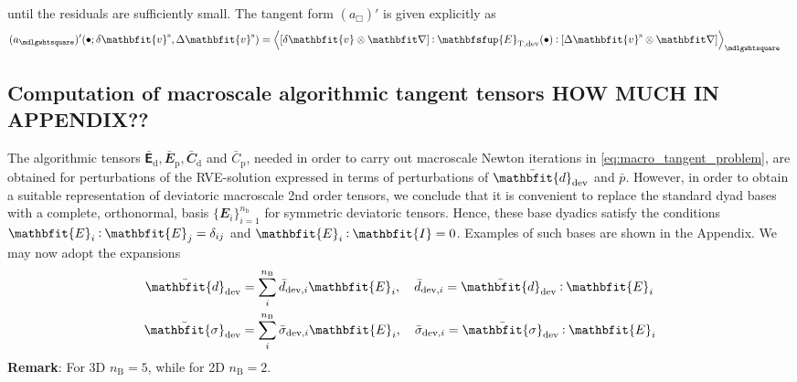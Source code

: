 \documentclass[12pt,a4paper,fleqn]{article}
\renewcommand{\ta}[1]{\mathbfit{#1}}
\renewcommand{\ts}[1]{\mathbfit{#1}}
\renewcommand{\tf}[1]{\mathbfsfup{#1}}
\renewcommand{\Box}{\mdlgwhtsquare}
\newcommand{\ded}{\mathrm{d}}
\newcommand{\dep}{\mathrm{p}}
\begin{document}
until the residuals are sufficiently small.
The tangent form $(a_\Box)'$ is given explicitly as
\begin{align}
    (a_\Box)'(\bullet; \delta \ta{v}^\fluct,\Delta{\ta{v}}^\fluct)
    & =
    \left\langle \left[\delta\ta{v}\outerp\diff\right] \dprod \tf{E}_{\majorT,\dev}(\bullet) \dprod
    \left[\Delta\ta{v}^\fluct\outerp\diff\right] \right\rangle_\Box
\end{align}


\subsection{Computation of macroscale algorithmic tangent tensors HOW MUCH IN APPENDIX??}

The algorithmic tensors $\bar{\tf{E}}_\ded, \bar{\ts E }_\dep, \bar{\ts C}_\ded$ and $\bar{C}_\dep$, needed in order to carry out macroscale Newton iterations in \eqref{eq:macro_tangent_problem}, are obtained for perturbations of the RVE-solution expressed in terms of perturbations of $\bar{\ts d}_\dev$ and $\bar{p}$. However, in order to obtain a suitable representation of deviatoric macroscale 2nd order tensors, we conclude that it is convenient to replace the standard dyad bases with a complete, orthonormal, basis $\{\ts E_i\}_{i=1}^{n_{\mathrm{b}}}$ for symmetric deviatoric tensors.
Hence, these base dyadics satisfy the conditions $\ts E_i \dprod \ts E_j = \delta_{ij}$ and $\ts E_i\dprod{\ts I}=0$.
Examples of such bases are shown in the Appendix. We may now adopt the expansions
\begin{align}
 \bar{\ts d}_\dev &= \sum_i^{n_{\mathrm{B}}} \bar{d}_{\dev,i} \ts E_i,\quad  \bar{d}_{\dev,i} = \bar{\ts d}_\dev\dprod \ts E_i
\label{eq:901} \\
 \bar{\ts\sigma}_\dev &= \sum_i^{n_{\mathrm{B}}} \bar{\sigma}_{\dev,i} \ts E_i,\quad \bar{\sigma}_{\dev,i} = \bar{\ts\sigma}_\dev\dprod \ts E_i
\label{eq:902}
\end{align}
\textbf{Remark}: For 3D $n_{\mathrm{B}} = 5$, while for 2D $n_{\mathrm{B}} = 2$.
\end{document}
